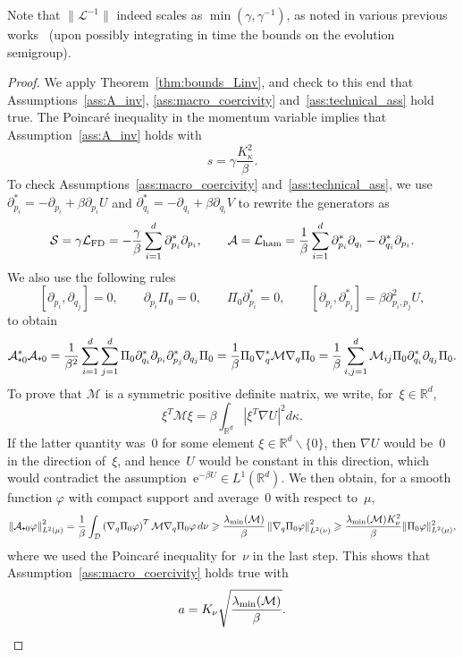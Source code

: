 \documentclass{article}
\newcommand{\dps}{\displaystyle }
\newcommand{\rme}{\mathrm{e}}
\newcommand{\cL}{\mathcal{L}}
\newcommand{\cLs}{\mathcal{S}}
\newcommand{\cLa}{\mathcal{A}}
\newcommand{\cLham}{\mathcal{L}_{\rm ham}}
\newcommand{\cLFD}{\mathcal{L}_{\rm FD}}
\newcommand{\cD}{\mathcal{D}}
\newcommand{\R}{\mathbb{R}}
\newcommand{\subplus}{\textnormal{\texttt{+}}}
\renewcommand{\geq}{\geqslant}
\begin{document}
Note that $\|\cL^{-1}\|$ indeed scales as $\dps \min(\gamma,\gamma^{-1})$, as noted in various previous works~\cite{DKMS13,GS16,IOS19} (upon possibly integrating in time the bounds on the evolution semigroup).

\begin{proof}
  We apply Theorem~\ref{thm:bounds_Linv}, and check to this end that Assumptions~\ref{ass:A_inv}, \ref{ass:macro_coercivity} and~\ref{ass:technical_ass} hold true. The Poincar\'e inequality in the momentum variable implies that Assumption~\ref{ass:A_inv} holds with
\[
  s = \gamma \frac{K_\kappa^2}{\beta}.
\]
To check Assumptions~\ref{ass:macro_coercivity} and~\ref{ass:technical_ass}, we use $\partial_{p_i}^* = -\partial_{p_i} + \beta \partial_{p_i} U$ and $\partial_{q_i}^* = -\partial_{q_i} + \beta \partial_{q_i} V$ to rewrite the generators as
\[
\cLs = \gamma \cLFD = -\frac \gamma \beta \sum_{i=1}^d \partial_{p_i}^* \partial_{p_i},
\qquad \cLa = \cLham = \frac{1}{\beta} \sum_{i=1}^d \partial_{p_i}^* \partial_{q_i} - \partial_{q_i}^* \partial_{p_i}.
\]
We also use the following rules
\[
[\partial_{p_{i}}, \partial_{q_{j}}] = 0, \qquad \partial_{p_i} \Pi_0 = 0, \qquad \Pi_0 \partial_{p_i}^* = 0, \qquad [\partial_{p_i},\partial_{p_j}^*] = \beta \partial_{p_i,p_j}^2 U,
\]
to obtain 
\begin{equation}
  \label{eq:A^*A_Langevin}
\cLa_{\subplus 0}^*\cLa_{\subplus 0} = \frac 1 {\beta^{2}} \sum_{i=1}^{d} \sum_{j=1}^{d} \Pi_{0} \partial_{q_{i}}^{*} \partial_{p_{i}} \partial_{p_{j}}^{*} \partial_{q_{j}} \Pi_{0}  = \frac1\beta \Pi_{0} \nabla_q^* \mathcal{M} \nabla_q \Pi_0 = \frac1\beta \sum_{i,j=1}^d \mathcal{M}_{ij}  \Pi_{0} \partial_{q_i}^* \partial_{q_j} \Pi_0.
\end{equation}
To prove that $\mathcal{M}$ is a symmetric positive definite matrix, we write, for~$\xi \in \R^d$,
\[
\xi^T \mathcal{M} \xi = \beta \int_{\R^d} \left|\xi^T \nabla U\right|^2 d\kappa. 
\]
If the latter quantity was~0 for some element $\xi \in \R^d \backslash \{0\}$, then $\nabla U$ would be~0 in the direction of~$\xi$, and hence~$U$ would be constant in this direction, which would contradict the assumption~$\rme^{-\beta U} \in L^1(\R^d)$. We then obtain, for a smooth function $\varphi$ with compact support and average~0 with respect to~$\mu$,
\[
  \left\|\cLa_{\subplus 0}\varphi\right\|_{L^2(\mu)}^2 = \frac{1}{\beta}\int_\cD \left(\nabla_q \Pi_0 \varphi\right)^T \mathcal{M} \nabla_q \Pi_0 \varphi \,  d\nu \geq \frac{\lambda_{\rm min}(\mathcal{M})}{\beta} \left\| \nabla_q \Pi_0 \varphi \right\|^2_{L^2(\nu)} \geq \frac{\lambda_{\rm min}(\mathcal{M}) K_\nu^2}{\beta} \|\Pi_0 \varphi\|_{L^2(\mu)}^2,
\]
where we used the Poincar\'e inequality for~$\nu$ in the last step. This shows that Assumption~\ref{ass:macro_coercivity} holds true with
\[
a = K_\nu \sqrt{\frac{\lambda_{\rm min}(\mathcal{M})}{\beta}}.
\]


\end{proof}
\end{document}
